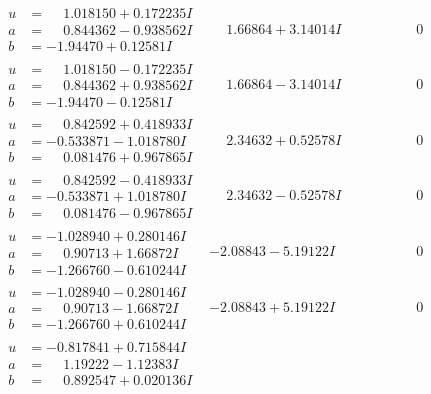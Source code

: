 \documentclass[1p]{elsarticle_modified}
\theoremstyle{definition}
\begin{document}
$$\begin{array}{c|c|c}
\begin{aligned}
u &= \phantom{-}1.018150 + 0.172235 I \\
a &= \phantom{-}0.844362 - 0.938562 I \\
b &= -1.94470 + 0.12581 I\end{aligned}
 & \phantom{-}1.66864 + 3.14014 I & \phantom{-0.000000 } 0 \\ \hline\begin{aligned}
u &= \phantom{-}1.018150 - 0.172235 I \\
a &= \phantom{-}0.844362 + 0.938562 I \\
b &= -1.94470 - 0.12581 I\end{aligned}
 & \phantom{-}1.66864 - 3.14014 I & \phantom{-0.000000 } 0 \\ \hline\begin{aligned}
u &= \phantom{-}0.842592 + 0.418933 I \\
a &= -0.533871 - 1.018780 I \\
b &= \phantom{-}0.081476 + 0.967865 I\end{aligned}
 & \phantom{-}2.34632 + 0.52578 I & \phantom{-0.000000 } 0 \\ \hline\begin{aligned}
u &= \phantom{-}0.842592 - 0.418933 I \\
a &= -0.533871 + 1.018780 I \\
b &= \phantom{-}0.081476 - 0.967865 I\end{aligned}
 & \phantom{-}2.34632 - 0.52578 I & \phantom{-0.000000 } 0 \\ \hline\begin{aligned}
u &= -1.028940 + 0.280146 I \\
a &= \phantom{-}0.90713 + 1.66872 I \\
b &= -1.266760 - 0.610244 I\end{aligned}
 & -2.08843 - 5.19122 I & \phantom{-0.000000 } 0 \\ \hline\begin{aligned}
u &= -1.028940 - 0.280146 I \\
a &= \phantom{-}0.90713 - 1.66872 I \\
b &= -1.266760 + 0.610244 I\end{aligned}
 & -2.08843 + 5.19122 I & \phantom{-0.000000 } 0 \\ \hline\begin{aligned}
u &= -0.817841 + 0.715844 I \\
a &= \phantom{-}1.19222 - 1.12383 I \\
b &= \phantom{-}0.892547 + 0.020136 I\end{aligned}

\end{array}$$
\end{document}
